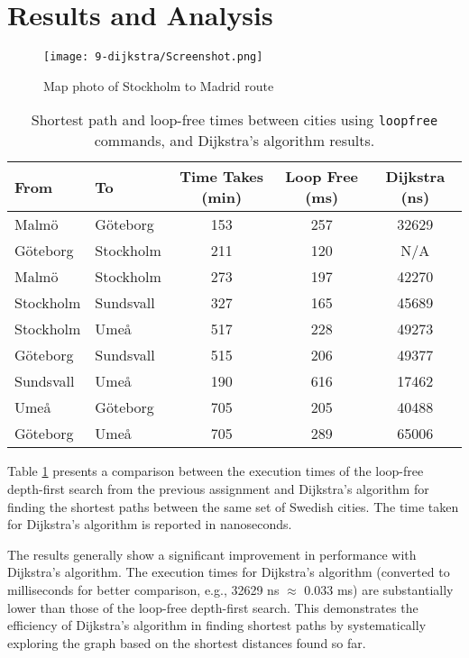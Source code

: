 \documentclass[a4paper,11pt]{article}
\begin{document}
\section*{Results and Analysis}
\begin{figure}
    \centering
    \texttt{[image: 9-dijkstra/Screenshot.png]}
    \caption{Map photo of Stockholm to Madrid route}
    \label{fig:stockholm2madrid}
\end{figure}


\begin{table}[h]
    \centering
    \begin{tabular}{|l|l|c|c|c|}
    \hline
    \textbf{From} & \textbf{To} & \textbf{Time Takes (min)} & \textbf{Loop Free (ms)} & \textbf{Dijkstra (ns)} \\
    \hline
    Malmö & Göteborg & 153 & 257 & 32629 \\
    Göteborg & Stockholm & 211 & 120 & N/A \\
    Malmö & Stockholm & 273 & 197 & 42270 \\
    Stockholm & Sundsvall & 327 & 165 & 45689 \\
    Stockholm & Umeå & 517 & 228 & 49273 \\
    Göteborg & Sundsvall & 515 & 206 & 49377 \\
    Sundsvall & Umeå & 190 & 616 & 17462 \\
    Umeå & Göteborg & 705 & 205 & 40488 \\
    Göteborg & Umeå & 705 & 289 & 65006 \\
    \hline
    \end{tabular}
    \caption{Shortest path and loop-free times between cities using \texttt{loopfree} commands, and Dijkstra's algorithm results.}
    \label{tab:city_paths_updated}
\end{table}

Table \ref{tab:city_paths_updated} presents a comparison between the execution times of the loop-free depth-first search from the previous assignment and Dijkstra's algorithm for finding the shortest paths between the same set of Swedish cities. The time taken for Dijkstra's algorithm is reported in nanoseconds.

The results generally show a significant improvement in performance with Dijkstra's algorithm. The execution times for Dijkstra's algorithm (converted to milliseconds for better comparison, e.g., 32629 ns $\approx$ 0.033 ms) are substantially lower than those of the loop-free depth-first search. This demonstrates the efficiency of Dijkstra's algorithm in finding shortest paths by systematically exploring the graph based on the shortest distances found so far.
\end{document}
